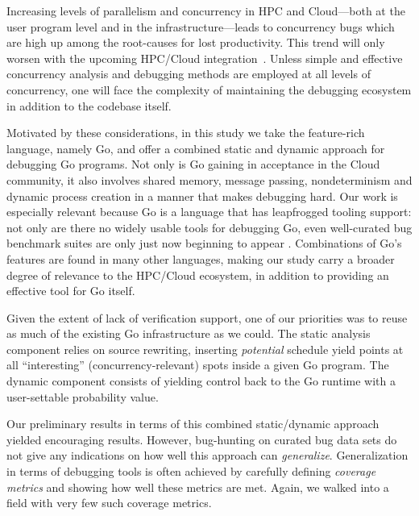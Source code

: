 
Increasing levels of parallelism and concurrency in HPC and Cloud---both
at the user program level and in the infrastructure---leads to concurrency
bugs which are high up among the root-causes for lost productivity.
%
This trend will only worsen with the upcoming HPC/Cloud
integration~\cite{dan-herbein-dong}.
%
Unless simple and effective concurrency analysis and
debugging methods are employed at all levels of
concurrency, one will face the complexity of maintaining
the debugging ecosystem in addition to the codebase itself.


Motivated by these considerations,
in this study we take the feature-rich language, namely Go,
and offer a combined static and dynamic approach for debugging
Go programs.
%
Not only is Go gaining in acceptance in the Cloud community,
it also involves shared memory, message passing, nondeterminism
and dynamic process creation in a manner that makes debugging hard.
%
Our work is especially relevant
because Go is a language that has leapfrogged tooling support: not only
are there no widely usable tools for debugging Go, even well-curated
bug benchmark suites are only just now beginning to appear \cite{tu-concurrentBugs-asplos19,yuan-gobench-cgo21}.
%
Combinations of Go's features are found in many other languages,
making our study carry a broader degree of relevance
to the HPC/Cloud ecosystem, in addition to providing an effective
tool for Go itself.


Given the extent of lack of verification support, one of
our priorities was to reuse as much of the existing Go infrastructure
as we could.
%
The static analysis component relies on source rewriting, inserting
{\em potential} schedule yield points
at all
``interesting'' (concurrency-relevant) spots inside a given Go program.
%
The dynamic component consists of yielding control back
to the Go runtime with a user-settable probability value. 


Our preliminary results in terms of this combined static/dynamic
approach yielded encouraging results.
%
However, bug-hunting on curated bug data sets do not give any
indications on how well this approach can {\em generalize}.
%
Generalization in terms of debugging tools is often achieved
by carefully defining {\em coverage metrics} and showing how
well these metrics are met.
%
Again, we walked into a field with very few such coverage metrics.

